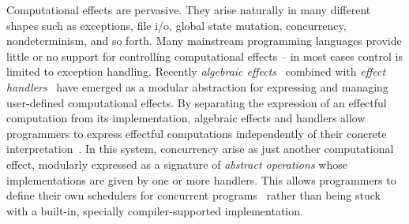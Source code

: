 \documentclass[12pt,mscres,cdtppar,twoside,openright,logo,rightchapter,normalheadings]{infthesis}
\theoremstyle{definition}
\begin{document}








Computational effects are pervasive. They arise naturally in many
different shapes such as exceptions, file i/o, global state mutation,
concurrency, nondeterminism, and so forth. Many mainstream programming
languages provide little or no support for controlling computational
effects -- in most cases control is limited to exception
handling. Recently \emph{algebraic
  effects}~\citep{Plotkin2001,Plotkin2003} combined with \emph{effect
  handlers}~\citep{Plotkin2013} have emerged as a modular abstraction
for expressing and managing user-defined computational effects. By
separating the expression of an effectful computation from its
implementation, algebraic effects and handlers allow programmers to
express effectful computations independently of their concrete
interpretation~\citep{Kammar2013}. In this system, concurrency arise
as just another computational effect, modularly expressed as a
signature of \emph{abstract operations} whose implementations are
given by one or more handlers. This allows programmers to define their
own schedulers for concurrent programs~\citep{Dolan2015} rather than
being stuck with a built-in, specially compiler-supported
implementation.
\end{document}
